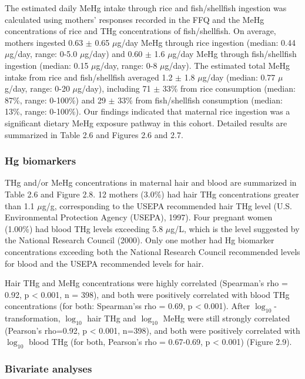 The estimated daily MeHg intake through rice and fish/shellfish ingestion was calculated using mothers' responses recorded in the FFQ and the MeHg concentrations of rice and THg concentrations of fish/shellfish. On average, mothers ingested 0.63 \({\pm}\) 0.65 \({\mu}\)g/day MeHg through rice ingestion (median: 0.44 \({\mu}\)g/day, range: 0-5.0 \({\mu}\)g/day) and 0.60 \({\pm}\) 1.6 \({\mu}\)g/day MeHg through fish/shellfish ingestion (median: 0.15 \({\mu}\)g/day, range: 0-8 \({\mu}\)g/day). The estimated total MeHg intake from rice and fish/shellfish averaged 1.2 \({\pm}\) 1.8 \({\mu}\)g/day (median: 0.77 \({\mu}\)g/day, range: 0-20 \({\mu}\)g/day), including 71 \({\pm}\) 33\% from rice consumption (median: 87\%, range: 0-100\%) and 29 \({\pm}\) 33\% from fish/shellfish consumption (median: 13\%, range: 0-100\%). Our findings indicated that maternal rice ingestion was a significant dietary MeHg exposure pathway in this cohort.  Detailed results are summarized in Table 2.6 and Figures 2.6 and 2.7.

\subsubsection{Hg biomarkers}

THg and/or MeHg concentrations in maternal hair and blood are summarized in Table 2.6 and Figure 2.8. 12 mothers (3.0\%) had hair THg concentrations greater than 1.1 \({\mu}\)g/g, corresponding to the USEPA recommended hair THg level (U.S. Environmental Protection Agency (USEPA), 1997). Four pregnant women (1.00\%) had blood THg levels exceeding 5.8 \({\mu}\)g/L, which is the level suggested by the National Research Council (2000). Only one mother had Hg biomarker concentrations exceeding both the National Research Council recommended levels for blood and the USEPA recommended levels for hair.

Hair THg and MeHg concentrations were highly correlated (Spearman's rho = 0.92, p < 0.001, n = 398), and both were positively correlated with blood THg concentrations (for both: Spearman'ss rho = 0.69, p < 0.001). After $\log_{10}$-transformation, $\log_{10}$ hair THg and $\log_{10}$ MeHg were still strongly correlated (Pearson's rho=0.92, p < 0.001, n=398), and both were positively correlated with $\log_{10}$ blood THg (for both, Pearson's rho = 0.67-0.69, p < 0.001) (Figure 2.9). 

\subsubsection{Bivariate analyses}


